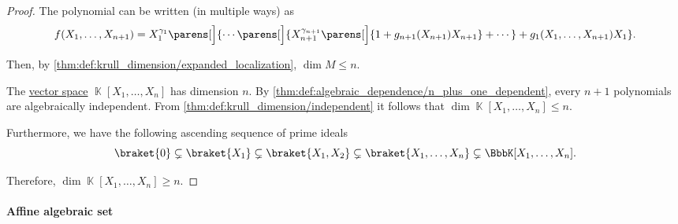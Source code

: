 \begin{proof}
  The polynomial can be written (in multiple ways) as
  \begin{equation*}
    f(X_1, \ldots, X_{n+1}) = X_1^{\gamma_1} \parens[\Big]{ \cdots \parens[\Big]{ X_{n+1}^{\gamma_{n+1}} \parens[\Big]{ 1 + g_{n+1}(X_{n+1}) X_{n+1} } + \cdots } + g_1(X_1, \ldots, X_{n+1}) X_1 }.
  \end{equation*}

  Then, by \cref{thm:def:krull_dimension/expanded_localization}, \( \dim M \leq n \).

   The \hyperref[def:vector_space]{vector space} \( \BbbK[X_1, \ldots, X_n] \) has dimension \( n \). By \cref{thm:def:algebraic_dependence/n_plus_one_dependent}, every \( n + 1 \) polynomials are algebraically independent. From \cref{thm:def:krull_dimension/independent} it follows that \( \dim \BbbK[X_1, \ldots, X_n] \leq n \).

  Furthermore, we have the following ascending sequence of prime ideals
  \begin{equation*}
    \braket{ 0 } \subsetneq \braket{ X_1 } \subsetneq \braket{ X_1, X_2 } \subsetneq \braket{ X_1, \ldots, X_n } \subsetneq \BbbK[X_1, \ldots, X_n].
  \end{equation*}

  Therefore, \( \dim \BbbK[X_1, \ldots, X_n] \geq n \).
\end{proof}

\paragraph{Affine algebraic set}

